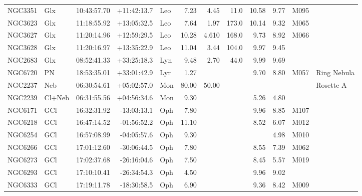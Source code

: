 \documentclass[11pt]{article}
\begin{document}
\begin{longtable}{llrrlrrrrrrl}
  NGC3351 & Glx     & 10:43:57.70 & +11:42:13.7 & Leo   & 7.23   & 4.45   & 11.0  & 10.58 & 9.77  & M095    &                                \\
  NGC3623 & Glx     & 11:18:55.92 & +13:05:32.5 & Leo   & 7.64   & 1.97   & 173.0 & 10.14 & 9.32  & M065    &                                \\
  NGC3627 & Glx     & 11:20:14.96 & +12:59:29.5 & Leo   & 10.28  & 4.610  & 168.0 & 9.73  & 8.92  & M066    &                                \\
  NGC3628 & Glx     & 11:20:16.97 & +13:35:22.9 & Leo   & 11.04  & 3.44   & 104.0 & 9.97  & 9.45  &         &                                \\
  NGC2683 & Glx     & 08:52:41.33 & +33:25:18.3 & Lyn   & 9.48   & 2.70   & 44.0  & 9.99  & 9.69  &         &                                \\
  NGC6720 & PN      & 18:53:35.01 & +33:01:42.9 & Lyr   & 1.27   &        &       & 9.70  & 8.80  & M057    & Ring Nebula                    \\
  NGC2237 & Neb     & 06:30:54.61 & +05:02:57.0 & Mon   & 80.00  & 50.00  &       &       &       &         & Rosette A                      \\
  NGC2239 & Cl+Neb  & 06:31:55.56 & +04:56:34.6 & Mon   & 9.30   &        &       & 5.26  & 4.80  &         &                                \\
  NGC6171 & GCl     & 16:32:31.92 & -13:03:13.1 & Oph   & 7.80   &        &       & 9.96  & 8.85  & M107    &                                \\
  NGC6218 & GCl     & 16:47:14.52 & -01:56:52.2 & Oph   & 11.10  &        &       & 8.52  & 6.07  & M012    &                                \\
  NGC6254 & GCl     & 16:57:08.99 & -04:05:57.6 & Oph   & 9.30   &        &       &       & 4.98  & M010    &                                \\
  NGC6266 & GCl     & 17:01:12.60 & -30:06:44.5 & Oph   & 7.80   &        &       & 8.55  & 7.39  & M062    &                                \\
  NGC6273 & GCl     & 17:02:37.68 & -26:16:04.6 & Oph   & 7.50   &        &       & 8.45  & 5.57  & M019    &                                \\
  NGC6293 & GCl     & 17:10:10.41 & -26:34:54.3 & Oph   & 4.50   &        &       & 9.96  & 9.02  &         &                                \\
  NGC6333 & GCl     & 17:19:11.78 & -18:30:58.5 & Oph   & 6.90   &        &       & 9.36  & 8.42  & M009    &                                \\

\end{longtable}
\end{document}
